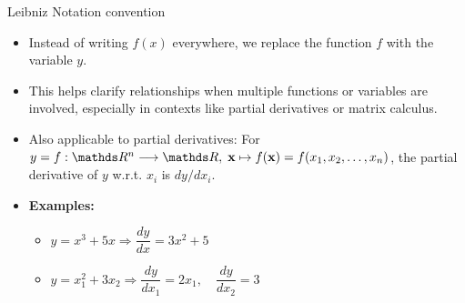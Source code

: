 \documentclass[11pt,compress,t,notes=noshow, xcolor=table]{beamer}
\newcommand{\deriv}{d}
\begin{document}
\begin{vbframe}{Leibniz Notation convention}
    \begin{itemize} \setlength{\itemsep}{0.5\baselineskip}
        \item Instead of writing $f(x)$ everywhere, we replace the function $f$ with the variable $y$.
\item This helps clarify relationships when multiple functions or variables are involved, especially in contexts like partial derivatives or matrix calculus.
  \item Also applicable to partial derivatives: For \( y = f:\R^n\longrightarrow\R,\; \xv\mapsto\fx=f(x_1, x_2, \ldots, x_n) \), the partial derivative of $y$ w.r.t. \( x_i \) is $
      \deriv y/\deriv x_i$.
\item \textbf{Examples:}
\begin{itemize}
    \item    $
      y = x^3 + 5x \Longrightarrow
      \dfrac{dy}{dx} = 3x^2 + 5
   $\\[10pt]
   \item $y = x_1^2 + 3x_2 \Longrightarrow
      \dfrac{\deriv y}{\deriv x_1} = 2x_1, \quad
      \dfrac{\deriv y}{\deriv x_2} = 3$
\end{itemize}
    \end{itemize}
\end{vbframe}
\end{document}
